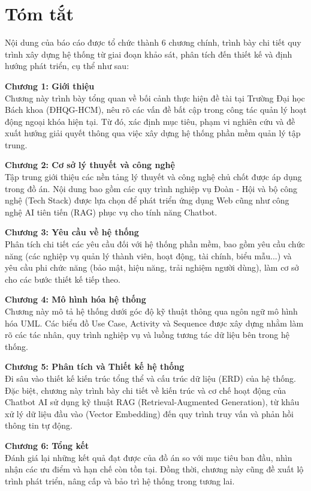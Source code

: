 \section*{Tóm tắt}

Nội dung của báo cáo được tổ chức thành 6 chương chính, trình bày chi tiết quy trình xây dựng hệ thống từ giai đoạn khảo sát, phân tích đến thiết kế và định hướng phát triển, cụ thể như sau:

\textbf{Chương 1: Giới thiệu} \\
Chương này trình bày tổng quan về bối cảnh thực hiện đề tài tại Trường Đại học Bách khoa (ĐHQG-HCM), nêu rõ các vấn đề bất cập trong công tác quản lý hoạt động ngoại khóa hiện tại. Từ đó, xác định mục tiêu, phạm vi nghiên cứu và đề xuất hướng giải quyết thông qua việc xây dựng hệ thống phần mềm quản lý tập trung.

\textbf{Chương 2: Cơ sở lý thuyết và công nghệ} \\
Tập trung giới thiệu các nền tảng lý thuyết và công nghệ chủ chốt được áp dụng trong đồ án. Nội dung bao gồm các quy trình nghiệp vụ Đoàn - Hội và bộ công nghệ (Tech Stack) được lựa chọn để phát triển ứng dụng Web cũng như công nghệ AI tiên tiến (RAG) phục vụ cho tính năng Chatbot.

\textbf{Chương 3: Yêu cầu về hệ thống} \\
Phân tích chi tiết các yêu cầu đối với hệ thống phần mềm, bao gồm yêu cầu chức năng (các nghiệp vụ quản lý thành viên, hoạt động, tài chính, biểu mẫu...) và yêu cầu phi chức năng (bảo mật, hiệu năng, trải nghiệm người dùng), làm cơ sở cho các bước thiết kế tiếp theo.

\textbf{Chương 4: Mô hình hóa hệ thống} \\
Chương này mô tả hệ thống dưới góc độ kỹ thuật thông qua ngôn ngữ mô hình hóa UML. Các biểu đồ Use Case, Activity và Sequence được xây dựng nhằm làm rõ các tác nhân, quy trình nghiệp vụ và luồng tương tác dữ liệu bên trong hệ thống.

\textbf{Chương 5: Phân tích và Thiết kế hệ thống} \\
Đi sâu vào thiết kế kiến trúc tổng thể và cấu trúc dữ liệu (ERD) của hệ thống. Đặc biệt, chương này trình bày chi tiết về kiến trúc và cơ chế hoạt động của Chatbot AI sử dụng kỹ thuật RAG (Retrieval-Augmented Generation), từ khâu xử lý dữ liệu đầu vào (Vector Embedding) đến quy trình truy vấn và phản hồi thông tin tự động.

\textbf{Chương 6: Tổng kết} \\
Đánh giá lại những kết quả đạt được của đồ án so với mục tiêu ban đầu, nhìn nhận các ưu điểm và hạn chế còn tồn tại. Đồng thời, chương này cũng đề xuất lộ trình phát triển, nâng cấp và bảo trì hệ thống trong tương lai.

\clearpage